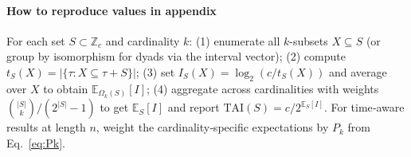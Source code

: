 \documentclass[10pt,twocolumn]{article}
\numberwithin{equation}{section} %
\begin{document}
    \setlength{\aboverulesep}{0.3ex}
    \setlength{\belowrulesep}{0.3ex}

    \tablelasttail{\bottomrule}

    

    \endgroup

    \paragraph{How to reproduce values in appendix}
    For each set $S\subset\mathbb{Z}_c$ and cardinality $k$:
    (1) enumerate all $k$-subsets $X\subseteq S$ (or group by isomorphism for dyads via the interval vector);
    (2) compute $t_S(X)=|\{\tau : X\subseteq\tau{+}S\}|$;
    (3) set $I_S(X)=\log_2(c/t_S(X))$ and average over $X$ to obtain $\mathbb{E}_{\Omega_k(S)}[I]$;
    (4) aggregate across cardinalities with weights $\binom{|S|}{k}/(2^{|S|}-1)$ to get $\mathbb{E}_S[I]$ and report $\mathrm{TAI}(S)=c/2^{\mathbb{E}_S[I]}$.
    For time‑aware results at length $n$, weight the cardinality‑specific expectations by $P_k$ from Eq.~\ref{eq:Pk}.
\end{document}
